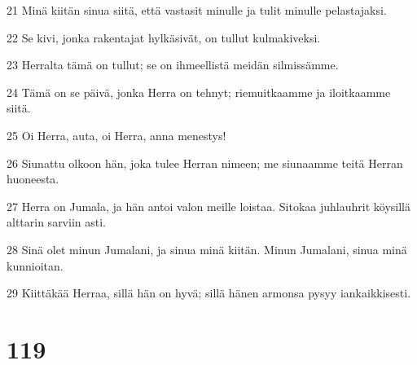 \par 21 Minä kiitän sinua siitä, että vastasit minulle ja tulit minulle pelastajaksi.
\par 22 Se kivi, jonka rakentajat hylkäsivät, on tullut kulmakiveksi.
\par 23 Herralta tämä on tullut; se on ihmeellistä meidän silmissämme.
\par 24 Tämä on se päivä, jonka Herra on tehnyt; riemuitkaamme ja iloitkaamme siitä.
\par 25 Oi Herra, auta, oi Herra, anna menestys!
\par 26 Siunattu olkoon hän, joka tulee Herran nimeen; me siunaamme teitä Herran huoneesta.
\par 27 Herra on Jumala, ja hän antoi valon meille loistaa. Sitokaa juhlauhrit köysillä alttarin sarviin asti.
\par 28 Sinä olet minun Jumalani, ja sinua minä kiitän. Minun Jumalani, sinua minä kunnioitan.
\par 29 Kiittäkää Herraa, sillä hän on hyvä; sillä hänen armonsa pysyy iankaikkisesti.

\chapter{119}

